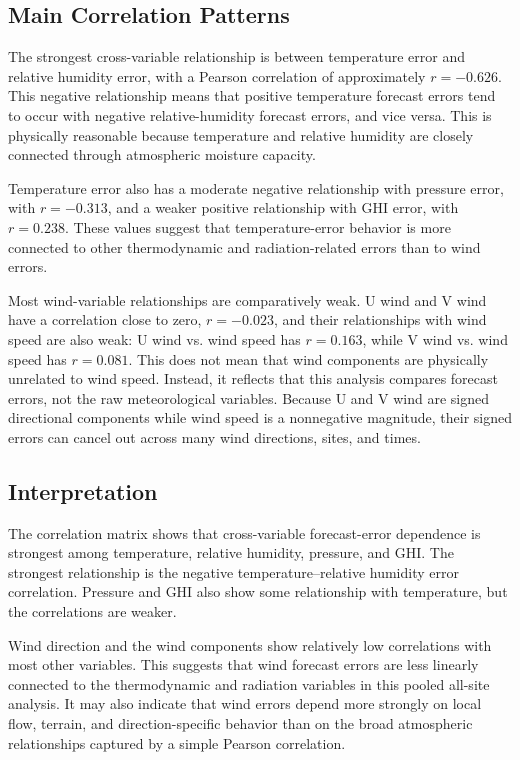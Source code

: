 \subsection{Main Correlation Patterns}

The strongest cross-variable relationship is between temperature error and relative humidity error, with a Pearson correlation of approximately $r=-0.626$. This negative relationship means that positive temperature forecast errors tend to occur with negative relative-humidity forecast errors, and vice versa. This is physically reasonable because temperature and relative humidity are closely connected through atmospheric moisture capacity.

Temperature error also has a moderate negative relationship with pressure error, with $r=-0.313$, and a weaker positive relationship with GHI error, with $r=0.238$. These values suggest that temperature-error behavior is more connected to other thermodynamic and radiation-related errors than to wind errors.

Most wind-variable relationships are comparatively weak. U wind and V wind have a correlation close to zero, $r=-0.023$, and their relationships with wind speed are also weak: U wind vs. wind speed has $r=0.163$, while V wind vs. wind speed has $r=0.081$. This does not mean that wind components are physically unrelated to wind speed. Instead, it reflects that this analysis compares forecast errors, not the raw meteorological variables. Because U and V wind are signed directional components while wind speed is a nonnegative magnitude, their signed errors can cancel out across many wind directions, sites, and times.

\subsection{Interpretation}

The correlation matrix shows that cross-variable forecast-error dependence is strongest among temperature, relative humidity, pressure, and GHI. The strongest relationship is the negative temperature--relative humidity error correlation. Pressure and GHI also show some relationship with temperature, but the correlations are weaker.

Wind direction and the wind components show relatively low correlations with most other variables. This suggests that wind forecast errors are less linearly connected to the thermodynamic and radiation variables in this pooled all-site analysis. It may also indicate that wind errors depend more strongly on local flow, terrain, and direction-specific behavior than on the broad atmospheric relationships captured by a simple Pearson correlation.

